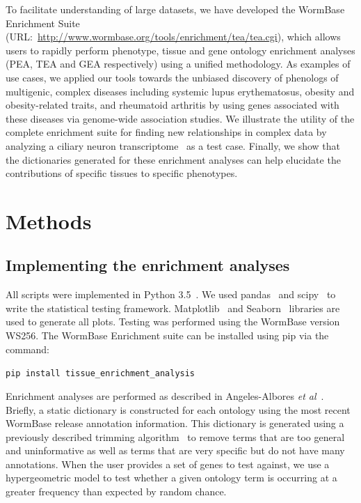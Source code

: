 \documentclass[10pt, onecolumn]{article}
\begin{document}
To facilitate understanding of large datasets, we have developed the WormBase
Enrichment Suite (URL:\
\url{http://www.wormbase.org/tools/enrichment/tea/tea.cgi}), which allows users to
rapidly perform phenotype, tissue and gene ontology enrichment analyses (PEA,
TEA and GEA respectively) using a unified methodology. As examples of use cases,
we applied our tools towards
the unbiased discovery of phenologs of multigenic, complex diseases including
systemic lupus erythematosus, obesity and obesity-related traits, and rheumatoid
arthritis by using genes associated with these diseases via genome-wide
association studies. We illustrate the utility of the complete enrichment suite
for finding new relationships in complex data by analyzing a ciliary neuron
transcriptome~\cite{Wang2015} as a test case. Finally, we show that the
dictionaries generated for these enrichment analyses can help elucidate the
contributions of specific tissues to specific phenotypes.

\section*{Methods}
\subsection*{Implementing the enrichment analyses}
All scripts were implemented in Python 3.5~\cite{Rossum2011}. We used
pandas~\cite{McKinney2011} and scipy~\cite{Oliphant2007} to write the
statistical testing framework. Matplotlib~\cite{Hunter2007} and
Seaborn~\cite{Waskom} libraries are used to generate all plots. Testing was
performed using the WormBase version WS256. The WormBase Enrichment suite can be
installed using pip via the command:

\texttt{pip install tissue\_enrichment\_analysis}

Enrichment analyses are performed as described in Angeles-Albores
\emph{et al}~\cite{Angeles-Albores2016}.
Briefly, a static dictionary is constructed for each ontology using the most
recent WormBase release annotation information. This dictionary is generated
using a previously described trimming algorithm~\cite{Angeles-Albores2016} to remove
terms that are too general and uninformative as well as terms that are very
specific but do not have many annotations. When the user provides a set of genes
to test against, we use a hypergeometric model to test whether a given ontology
term is occurring at a greater frequency than expected by random chance.
\end{document}
